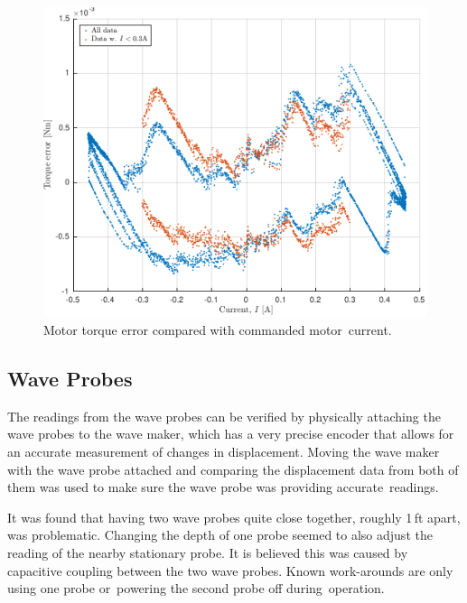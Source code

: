 \documentclass[hardware,article,submit,pdftex,moreauthors]{Definitions/mdpi}
\begin{document}
\begin{figure}[H]
  \centering
  \includegraphics[width=1\textwidth]{diagrams/torque_error_3.pdf}
  \caption{Motor torque error compared with commanded motor~current.} %
  \label{fig:TorqueError}
\end{figure}
\unskip

\subsection{Wave Probes}	\label{waveprobes}
The readings from the wave probes can be verified by physically attaching the wave probes to the wave maker, which has a very precise encoder that allows for an accurate measurement of changes in displacement.
Moving the wave maker with the wave probe attached and comparing the displacement data from both of them was used to make sure the wave probe was providing accurate~readings.

It was found that having two wave probes quite close together, roughly 1\,ft apart, was problematic.
Changing the depth of one probe seemed to also adjust the reading of the nearby stationary probe.
It is believed this was caused by capacitive coupling between the two wave probes.
Known work-arounds are only using one probe or~powering the second probe off during~operation.
\end{document}
